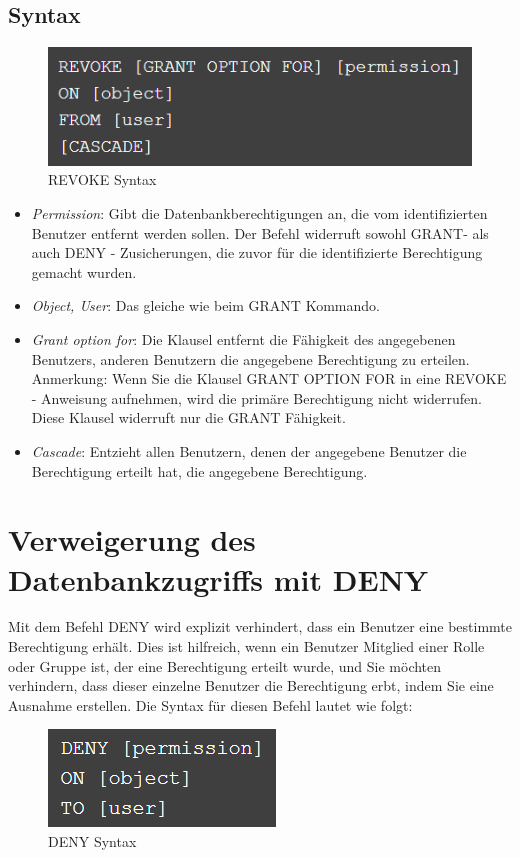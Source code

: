 \subsection{Syntax}
\begin{figure}[h]
    \centering
    \includegraphics[width=.30\textwidth]{Content/images/dcl/syntax_revoke.png}
    \caption{REVOKE Syntax}
    \label{fig:syntax-revoke}
 \end{figure}

\begin{itemize}
    \item \emph{Permission}: Gibt die Datenbankberechtigungen an, die vom identifizierten Benutzer entfernt werden sollen. Der Befehl widerruft sowohl GRANT- als auch DENY - Zusicherungen, die zuvor für die identifizierte Berechtigung gemacht wurden.
    \item \emph{Object, User}: Das gleiche wie beim GRANT Kommando.
    \item \emph{Grant option for}: Die Klausel entfernt die Fähigkeit des angegebenen Benutzers, anderen Benutzern die angegebene Berechtigung zu erteilen. Anmerkung: Wenn Sie die Klausel GRANT OPTION FOR in eine REVOKE - Anweisung aufnehmen, wird die primäre Berechtigung nicht widerrufen. Diese Klausel widerruft nur die GRANT Fähigkeit.
    \item \emph{Cascade}: Entzieht allen Benutzern, denen der angegebene Benutzer die Berechtigung erteilt hat, die angegebene Berechtigung.
\end{itemize}

\section{Verweigerung des Datenbankzugriffs mit DENY}
Mit dem Befehl DENY wird explizit verhindert, dass ein Benutzer eine bestimmte Berechtigung erhält. Dies ist hilfreich, wenn ein Benutzer Mitglied einer Rolle oder Gruppe ist, der eine Berechtigung erteilt wurde, und Sie möchten verhindern, dass dieser einzelne Benutzer die Berechtigung erbt, indem Sie eine Ausnahme erstellen. Die Syntax für diesen Befehl lautet wie folgt:

\begin{figure}[h]
    \centering
    \includegraphics[width=.30\textwidth]{Content/images/dcl/syntax_deny.png}
    \caption{DENY Syntax}
    \label{fig:syntax-deny}
 \end{figure}

